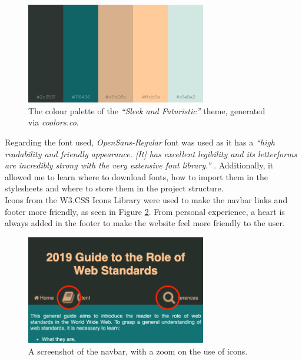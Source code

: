 \documentclass[letterpaper,12pt]{article}
\begin{document}
\begin{figure}[h] 
\centerline{\includegraphics[width=0.7\textwidth]{report/images/colour-palette.png}}
\caption{\label{fig:colour-palette}The colour palette of the \textit{``Sleek and Futuristic''} theme, generated via \textit{coolors.co}.}
\end{figure}

Regarding the font used, \textit{OpenSans-Regular} font was used as it has a \textit{``high readability and friendly appearance. [It] has excellent legibility and its letterforms are incredibly strong with the very extensive font library.''} \cite{open-sans-font}. Additionally, it allowed me to learn where to download fonts, how to import them in the stylesheets and where to store them in the project structure.\\

Icons from the W3.CSS Icons Library \cite{w3-css-icons} were used to make the navbar links and footer more friendly, as seen in Figure \ref{fig:navbar-icons}. From personal experience, a heart is always added in the footer to make the website feel more friendly to the user.

\begin{figure}[h] 
\centerline{\includegraphics[width=0.7\textwidth]{report/images/navbar-icons.png}}
\caption{\label{fig:navbar-icons}A screenshot of the navbar, with a zoom on the use of icons.}
\end{figure}
\end{document}
